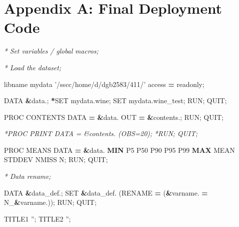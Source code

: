\documentclass[]{article}
\newenvironment{Shaded}{\begin{snugshade}}{\end{snugshade}}
\newcommand{\KeywordTok}[1]{\textcolor[rgb]{0.13,0.29,0.53}{\textbf{{#1}}}}
\newcommand{\DataTypeTok}[1]{\textcolor[rgb]{0.13,0.29,0.53}{{#1}}}
\newcommand{\StringTok}[1]{\textcolor[rgb]{0.31,0.60,0.02}{{#1}}}
\newcommand{\CommentTok}[1]{\textcolor[rgb]{0.56,0.35,0.01}{\textit{{#1}}}}
\newcommand{\FunctionTok}[1]{\textcolor[rgb]{0.00,0.00,0.00}{{#1}}}
\newcommand{\NormalTok}[1]{{#1}}
\begin{document}
\newpage

\section{Appendix A: Final Deployment
Code}\label{appendix-a-final-deployment-code}

\begin{Shaded}
\begin{Highlighting}[]

\CommentTok{* Set variables / global macros;}

\NormalTok{%
\NormalTok{%
\NormalTok{%

\NormalTok{%
\NormalTok{%



\CommentTok{* Load the dataset;}

\NormalTok{libname mydata }\StringTok{'/sscc/home/d/dgb2583/411/'} \FunctionTok{access} \KeywordTok{=} \NormalTok{readonly;}

\DataTypeTok{DATA} \KeywordTok{&}\NormalTok{data.;}
    \KeywordTok{*}\NormalTok{SET mydata.wine;}
    \NormalTok{SET mydata.wine_test;}
\NormalTok{RUN; QUIT;}

\NormalTok{PROC CONTENTS DATA }\KeywordTok{=} \KeywordTok{&}\NormalTok{data. OUT }\KeywordTok{=} \KeywordTok{&}\NormalTok{contents.;}
\NormalTok{RUN; QUIT;}

\CommentTok{*PROC PRINT DATA = &contents. (OBS=20);}
\CommentTok{*RUN; QUIT;}

\NormalTok{PROC MEANS DATA }\KeywordTok{=} \KeywordTok{&}\NormalTok{data. }\KeywordTok{MIN} \NormalTok{P5 P50 P90 P95 P99 }\KeywordTok{MAX} \NormalTok{MEAN STDDEV NMISS N;}
\NormalTok{RUN; QUIT;}



\CommentTok{* Data rename;}

\NormalTok{%
\DataTypeTok{    DATA} \KeywordTok{&}\NormalTok{data_def.;}
        \NormalTok{SET }\KeywordTok{&}\NormalTok{data_def. (RENAME }\KeywordTok{=} \NormalTok{(}\KeywordTok{&}\NormalTok{varname. }\KeywordTok{=} \NormalTok{N_}\KeywordTok{&}\NormalTok{varname.));}
    \NormalTok{RUN; QUIT;}
\NormalTok{%

\NormalTok{TITLE1 }\StringTok{''}\NormalTok{;}
\NormalTok{TITLE2 }\StringTok{''}\NormalTok{;}

}}}}}}}
\end{Highlighting}
\end{Shaded}
\end{document}
